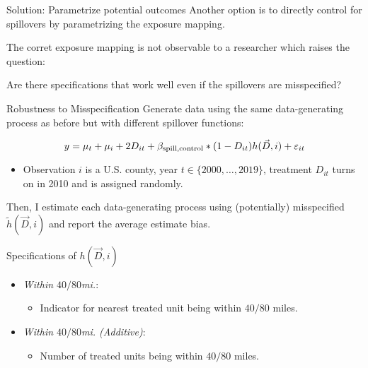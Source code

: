 \documentclass[aspectratio=169]{beamer}
\begin{document}
\begin{frame}{Solution: Parametrize potential outcomes}
    Another option is to directly control for spillovers by parametrizing the exposure mapping. 
    
    The corret exposure mapping is not observable to a researcher which raises the question:

    Are there specifications that work well even if the spillovers are misspecified?
\end{frame}

\begin{frame}{Robustness to Misspecification}
    Generate data using the same data-generating process as before but with different spillover functions:

    \[ 
        y_{\it} = \mu_t + \mu_i + 2 D_{it} + \beta_{\text{spill,control}} * (1-D_{it}) h(\vec{D}, i) + \varepsilon_{it}
    \]

    \begin{itemize}
        \item Observation $i$ is a U.S. county, year $t \in \{2000, \dots, 2019\}$, treatment $D_{it}$ turns on in 2010 and is assigned randomly.
    \end{itemize}

    Then, I estimate each data-generating process using (potentially) misspecified $\tilde{h}(\vec{D}, i)$ and report the average estimate bias.
\end{frame}

\begin{frame}{Specifications of $h(\vec{D}, i)$}
    
    \begin{itemize}
        \item \textit{Within $40/80$mi.}:
        \begin{itemize}
            \item Indicator for nearest treated unit being within $40/80$ miles.
        \end{itemize}
        
        \item \textit{Within $40/80$mi. (Additive)}: 
        \begin{itemize}
            \item Number of treated units being within $40/80$ miles.
        \end{itemize}
        
    \end{itemize}

\end{frame}
\end{document}
